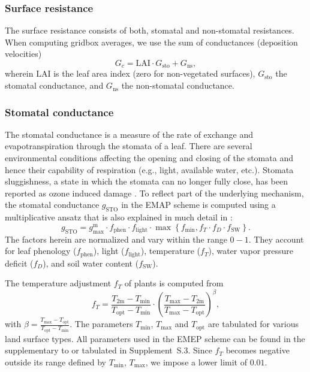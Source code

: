 \documentclass[gmd, manuscript]{copernicus}
\begin{document}
\subsubsection{Surface resistance}
\label{subsubsec:Rc}
The surface resistance consists of both, stomatal and non-stomatal resistances. When computing gridbox averages, we use the sum of conductances (deposition velocities)
\begin{equation}
  G_c = \text{LAI} \cdot G_\text{sto} + G_\text{ns}, 
\end{equation}
wherein $\text{LAI}$ is the leaf area index (zero for non-vegetated surfaces), $G_\text{sto}$ the stomatal conductance, and $G_\text{ns}$ the non-stomatal conductance.

\subsubsection*{Stomatal conductance}
The stomatal conductance is a measure of the rate of  exchange and evapotranspiration through the stomata of a leaf. There are several environmental conditions affecting the opening and closing of the stomata and hence their capability of respiration (e.g., light, available water, etc.). Stomata sluggishness, a state in which the stomata can no longer fully close, has been reported as ozone induced damage \citep{SR:Hoshika2015}. To reflect part of the underlying mechanism, the stomatal conductance $g_\text{STO}$ in the EMAP scheme is computed using a multiplicative ansatz that is also explained in much detail in \citet{ICP:MappingManual2017}:
%
\begin{equation}
  g_\text{STO} = g^\text{m}_\text{max} \cdot f_\text{phen} \cdot f_\text{light} \cdot \max{\left\{f_\text{min}, f_T \cdot f_D \cdot f_\text{SW}\right\}}.
  \label{eq:stomatal}
\end{equation}
%
The factors herein are normalized and vary within the range $0-1$. They account for leaf phenology ($f_\text{phen}$), light ($f_\text{light}$), temperature ($f_T$), water vapor pressure deficit ($f_D$), and soil water content ($f_\text{SW}$).

The temperature adjustment $f_T$ of plants is computed from
%
\begin{equation}
  f_T = \frac{T_\text{2m}-T_\text{min}}{T_\text{opt}-T_\text{min}} \cdot \left(\frac{T_{\text{max}}-T_\text{2m}}{T_{\text{max}}-T_\text{opt}}\right)^\beta, 
\end{equation}
with $\beta = \frac{T_\text{max}-T_\text{opt}}{T_\text{opt}-T_\text{min}}$. The parameters $T_\text{min}$, $T_\text{max}$ and $T_\text{opt}$ are tabulated for various land surface types. All parameters used in the EMEP scheme can be found in the supplementary to \citet{ACP:Simpson2012} or tabulated in Supplement~S.3. Since $f_T$ becomes negative outside its range defined by $T_\text{min}$, $T_\text{max}$, we impose a lower limit of $0.01$.
\end{document}
